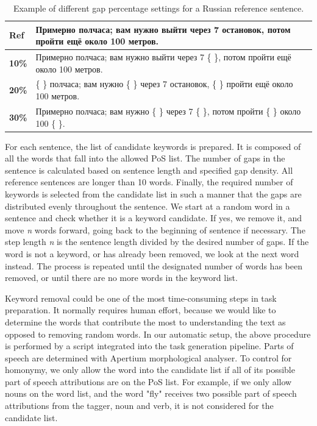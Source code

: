 \documentclass[11pt]{article}
\newcommand{\comment}[1]{}
\newcommand{\rus}[1]{\foreignlanguage{russian}{#1}}
\begin{document}
\begin{table}
  \centering
  \begin{tabular}{|l|l|}
     \hline
     \textbf{Ref} & \rus{{\small Примерно полчаса; вам нужно выйти через 7 остановок, потом пройти ещё около 100 метров.}} \\
     \hline
     \textbf{10\%} & \rus{{\small Примерно полчаса; вам нужно выйти через 7 \{ \}, потом пройти ещё около 100 метров.}} \\
     \textbf{20\%} & \rus{{\small \{ \} полчаса; вам нужно \{ \} через 7 остановок, \{ \} пройти ещё около 100 метров.}} \\
     \textbf{30\%} & \rus{{\small Примерно полчаса; вам нужно \{ \} через 7 \{ \}, потом пройти \{ \} около 100 \{ \}.}} \\
     \hline
  \end{tabular}
  \caption{Example of different gap percentage settings for a Russian reference sentence.} 
  \label{table:percentage}
\end{table}


For each sentence, the list of candidate keywords is prepared. It is composed of all the words that 
fall into the allowed PoS list. The number of gaps in the sentence is calculated based on 
sentence length and specified gap density. All reference sentences are longer than 10 words. Finally, the required number of keywords is selected 
from the candidate list in such a manner that the gaps are distributed evenly throughout the sentence. We start at a random word in a sentence and check whether it is a keyword candidate. If yes, we remove it, and move \emph{n} words forward, going back to the beginning of sentence if necessary. The step length \emph{n} is the sentence length divided by the desired number of gaps. If the word is not a keyword, or has already been removed, we look at the next word instead. The process is repeated until the designated number of words has been removed, or until there are no more words in the keyword list.

Keyword removal could be one of the most time-consuming steps in task preparation. It normally requires human effort, because we would like to determine the words that contribute the most to understanding the text as opposed to removing random words. In our automatic setup, the above procedure is performed by a script integrated into the task generation pipeline. Parts of speech are determined with Apertium morphological analyser. To control for homonymy, we only allow the word into the candidate list if all of its possible part of speech attributions are on the PoS list. For example, if we only allow nouns on the word list, and the word "fly" receives two possible part of speech attributions from the tagger, noun and verb, it is not considered for the candidate list.
\end{document}
